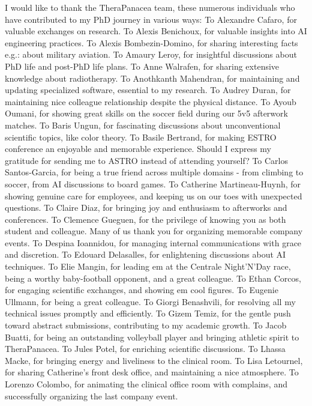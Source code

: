 I would like to thank the TheraPanacea team, these numerous individuals who have contributed to my PhD journey in various ways:\n
To Alexandre Cafaro, for valuable exchanges on research.\n
To Alexis Benichoux, for valuable insights into AI engineering practices.\n
To Alexis Bombezin-Domino, for sharing interesting facts e.g.: about military aviation.\n
To Amaury Leroy, for insightful discussions about PhD life and post-PhD life plans.\n
To Anne Walrafen, for sharing extensive knowledge about radiotherapy.\n
To Anothkanth Mahendran, for maintaining and updating specialized software, essential to my research.\n
To Audrey Duran, for maintaining nice colleague relationship despite the physical distance.\n
To Ayoub Oumani, for showing great skills on the soccer field during our 5v5 afterwork matches.\n
To Baris Ungun, for fascinating discussions about unconventional scientific topics, like color theory.\n
To Basile Bertrand, for making ESTRO conference an enjoyable and memorable experience.
Should I express my gratitude for sending me to ASTRO instead of attending yourself?\n
To Carlos Santos-Garcia, for being a true friend across multiple domains - from climbing to soccer, from AI discussions to board games.\n
To Catherine Martineau-Huynh, for showing genuine care for employees, and keeping us on our toes with unexpected questions.\n
To Claire Diaz, for bringing joy and enthusiasm to afterworks and conferences.\n
To Clemence Gueguen, for the privilege of knowing you as both student and colleague.
Many of us thank you for organizing memorable company events.\n
To Despina Ioannidou, for managing internal  communications with grace and discretion.\n
To Edouard Delasalles, for enlightening discussions about AI techniques.\n
To Elie Mangin, for leading em at the Centrale Night'N'Day race, being a worthy baby-football opponent, and a great colleague.\n
To Ethan Corcos, for engaging scientific exchanges, and showing em cool figures.\n
To Eugenie Ullmann, for being a great colleague.\n
To Giorgi Benashvili, for resolving all my technical issues promptly and efficiently.\n
To Gizem Temiz, for the gentle push toward abstract submissions, contributing to my academic growth.\n
To Jacob Buatti, for being an outstanding volleyball player and bringing athletic spirit to TheraPanacea.\n
To Jules Potel, for enriching scientific discussions.\n
To Lhassa Macke, for bringing energy and liveliness to the clinical room.\n
To Lisa Letournel, for sharing Catherine's front desk office, and maintaining a nice atmosphere.\n
To Lorenzo Colombo, for animating the clinical office room with complains, and successfully organizing the last company event.\n
